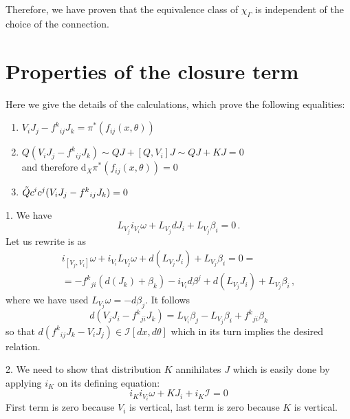 \documentclass[a4paper,12pt]{article}
\numberwithin{equation}{section} %
\newcommand{\dx}{\mathrm{d}_X}
\def\cI{\mathcal{I}}
\begin{document}
Therefore, we have proven that the equivalence class of $\chi_{\Gamma}$ is independent of the choice of the connection.



\section{Properties of the closure term}\label{App:closure}
Here we give the details of the calculations, which prove the following equalities:
\begin{enumerate}
    \item $V_i J_j - f^k{ }_{ij}J_k = \pi^*(f_{ij}(x,\theta))$
    \item $Q(V_iJ_j - f^k{ }_{ij}J_k) \sim  QJ + [Q,V_i]J \sim QJ + KJ = 0$\\ and therefore $\dx\pi^*(f_{ij}(x,\theta)) = 0$
    \item $\Tilde{Q}c^ic^j(V_iJ_j - f^k{ }_{ij}J_k) = 0$
\end{enumerate}

1. We have
\begin{equation}
    L_{V_j}i_{V_i} \omega  + L_{V_j}dJ_i + L_{V_j}\beta_i = 0\,.
\end{equation}
Let us rewrite is as 
\begin{equation}
\begin{gathered}
    i_{[V_j,V_i]}\omega + i_{V_i} L_{V_j} \omega + d(L_{V_j}J_i) + L_{V_j}\beta_i = 0 =\\ =-f^k{ }_{ji}(d(J_k) + \beta_k) - i_{V_i}d\beta^j + d(L_{V_j}J_i) + L_{V_j}\beta_i\,,
\end{gathered}
\end{equation}
where we have used $L_{V_j}\omega = -d\beta_j$. It follows 
\begin{equation} \label{dVJ-f}
    d(V_j J_i - f^k{ }_{ji}J_k) =L_{V_i}\beta_j - L_{V_j}\beta_i  + f^k{ }_{ji}\beta_k
\end{equation}
so that  $d(f^k{ }_{ij}J_k - V_i J_j) \in \cI[dx, d\theta]$ which in its turn implies the desired relation.

2. We need to show that distribution $K$ annihilates $J$ which is easily done by applying $i_K$ on its defining equation:
\begin{equation}
    i_K i_{V_i}\omega + KJ_i + i_K\cI = 0
\end{equation}
First term is zero because $V_i$ is vertical, last term is zero because $K$ is vertical.
\end{document}
